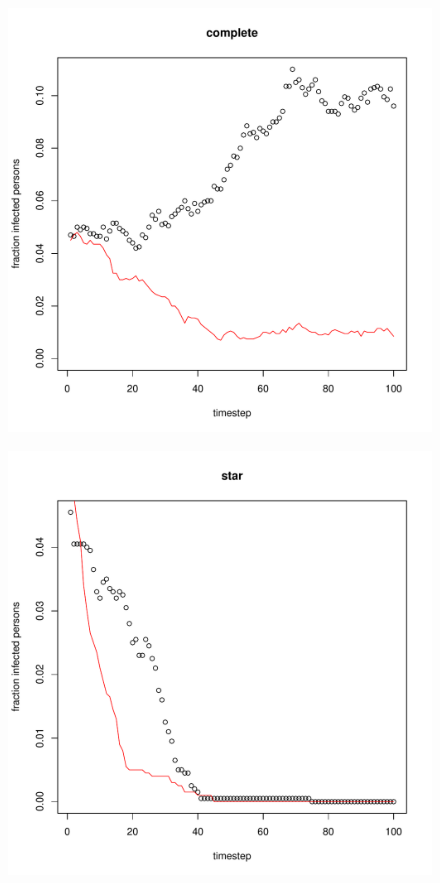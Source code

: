 \documentclass[paper=a4, fontsize=11pt]{scrartcl} %
\begin{document}
\begin{figure}[htbp] %
   \centering
   \includegraphics[width=\textwidth]{thresholdSimulation_complete} 
   \label{complete}
\end{figure}
\begin{figure}[htbp] %
   \centering
   \includegraphics[width=\textwidth]{thresholdSimulation_star} 
   \label{star}
\end{figure}
\end{document}
